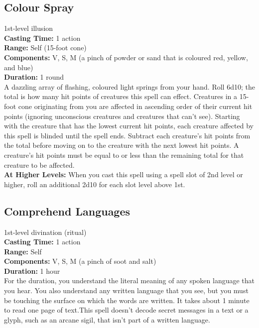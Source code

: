\documentclass[11pt, A4paper, english]{article}
\begin{document}
		\subsection{Colour Spray}
1st-level illusion \\
\textbf{Casting Time:} 1 action \\
\textbf{Range:} Self (15-foot cone) \\
\textbf{Components:} V, S, M (a pinch of powder or sand that is coloured red, yellow, and blue) \\
\textbf{Duration:} 1 round \\
A dazzling array of flashing, coloured light springs from your hand. Roll 6d10; the total is how many hit points of creatures this spell can effect. Creatures in a 15-foot cone originating from you are affected in ascending order of their current hit points (ignoring unconscious creatures and creatures that can't see). Starting with the creature that has the lowest current hit points, each creature affected by this spell is blinded until the spell ends. Subtract each creature’s hit points from the total before moving on to the creature with the next lowest hit points. A creature’s hit points must be equal to or less than the remaining total for that creature to be affected. \\
\textbf{At Higher Levels:} When you cast this spell using a spell slot of 2nd level or higher, roll an additional 2d10 for each slot level above 1st.

		\subsection{Comprehend Languages}
1st-level divination (ritual) \\
\textbf{Casting Time:} 1 action \\
\textbf{Range:} Self \\
\textbf{Components:} V, S, M (a pinch of soot and salt) \\
\textbf{Duration:} 1 hour \\
For the duration, you understand the literal meaning of any spoken language that you hear. You also understand any written language that you see, but you must be touching the surface on which the words are written. It takes about 1  minute to read one page of text.This spell doesn't decode secret messages in a text or a glyph, such as an arcane sigil, that isn't part of a written language.
\end{document}
